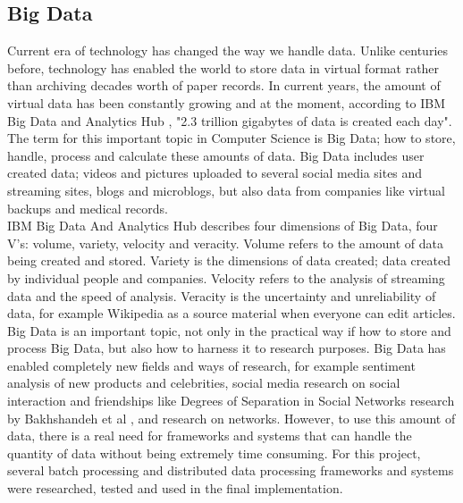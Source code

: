 \documentclass{article}
\theoremstyle{definition}
\begin{document}
\subsection{Big Data}
Current era of technology has changed the way we handle data. Unlike centuries before, technology has enabled the world to store data in virtual format rather than archiving decades worth of paper records. In current years, the amount of virtual data has been constantly growing and at the moment, according to IBM Big Data and Analytics Hub \cite{ibm}, "2.3 trillion gigabytes of data is created each day". The term for this important topic in Computer Science is Big Data; how to store, handle, process and calculate these amounts of data. Big Data includes user created data; videos and pictures uploaded to several social media sites and streaming sites, blogs and microblogs, but also data from companies like virtual backups and medical records. \\

IBM Big Data And Analytics Hub describes four dimensions of Big Data, four V's: volume, variety, velocity and veracity. Volume refers to the amount of data being created and stored. Variety is the dimensions of data created; data created by individual people and companies. Velocity refers to the analysis of streaming data and the speed of analysis. Veracity is the uncertainty and unreliability of data, for example Wikipedia as a source material when everyone can edit articles. \\

Big Data is an important topic, not only in the practical way if how to store and process Big Data, but also how to harness it to research purposes. Big Data has enabled completely new fields and ways of research, for example sentiment analysis of new products and celebrities, social media research on social interaction and friendships like Degrees of Separation in Social Networks research by Bakhshandeh et al \cite{sixdegrees}, and research on networks. However, to use this amount of data, there is a real need for frameworks and systems that can handle the quantity of data without being extremely time consuming. For this project, several batch processing and distributed data processing frameworks and systems were researched, tested and used in the final implementation. \\
\end{document}
